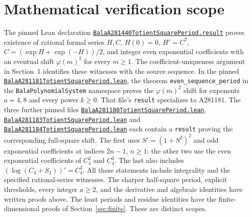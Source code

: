 \documentclass[11pt]{article}
\begin{document}
\section{Mathematical verification scope}
The pinned Lean declaration
\href{https://github.com/the-omega-institute/trureturing/blob/92de86888730265f84e24d28bdb67546c543a966/D5/S1/Recurrence/Periodic/BalaA281440TotientSquarePeriod.lean}{\nolinkurl{BalaA281440TotientSquarePeriod.result}}
proves existence of rational formal series $H,C$, $H(0)=0$, $H'=C^7$,
$C=(\exp H+\exp(-H))/2$, and integer even exponential coefficients with
an eventual shift $\varphi(m)^2$ for every $m\ge1$.
The coefficient-uniqueness argument in Section~1 identifies these witnesses
with the source sequence. In the pinned
\href{https://github.com/the-omega-institute/trureturing/blob/92de86888730265f84e24d28bdb67546c543a966/D5/S1/Recurrence/Periodic/BalaA281181TotientSquarePeriod.lean}{\nolinkurl{BalaA281181TotientSquarePeriod.lean}},
the theorem \texttt{even\_sequence\_period} in the
\texttt{BalaPolynomialSystem} namespace proves the
$\varphi(m)^2$ shift for exponents $a=4,8$ and every power $k\ge0$.
That file's \texttt{result} specializes to A281181.
The three further pinned files
\href{https://github.com/the-omega-institute/trureturing/blob/92de86888730265f84e24d28bdb67546c543a966/D5/S1/Recurrence/Periodic/BalaA281180TotientSquarePeriod.lean}{\nolinkurl{BalaA281180TotientSquarePeriod.lean}},
\href{https://github.com/the-omega-institute/trureturing/blob/92de86888730265f84e24d28bdb67546c543a966/D5/S1/Recurrence/Periodic/BalaA281183TotientSquarePeriod.lean}{\nolinkurl{BalaA281183TotientSquarePeriod.lean}} and
\href{https://github.com/the-omega-institute/trureturing/blob/92de86888730265f84e24d28bdb67546c543a966/D5/S1/Recurrence/Periodic/BalaA281184TotientSquarePeriod.lean}{\nolinkurl{BalaA281184TotientSquarePeriod.lean}}
each contain a \texttt{result} proving the corresponding full-square shift.
The first uses $S'=(1+S^2)^2$ and odd exponential coefficients at indices
$2n-1$, $n\ge1$; the other two use the even exponential coefficients
of $C_4^2$ and $C_4^3$. The last also includes
$(\log(C_4+S_4))'=C_4^3$. All these statements include integrality and
the specified rational-series witnesses.
The sharper half-square period, explicit thresholds, every integer $a\ge2$,
and the derivative and algebraic identities have written proofs above. The least periods
and residue identities have the finite-dimensional proofs of Section~\ref{sec:finite}.
These are distinct scopes.
\end{document}
